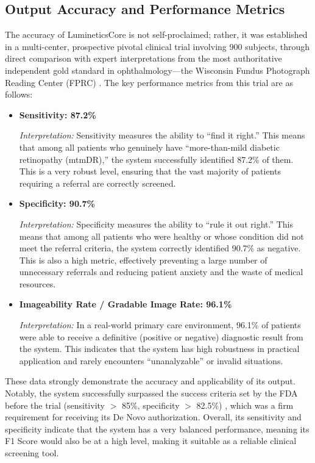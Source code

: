 \documentclass[sigplan,screen]{acmart}
\begin{document}
\subsection{Output Accuracy and Performance Metrics}

The accuracy of LumineticsCore is not self-proclaimed; rather, it was established in a multi-center, prospective pivotal clinical trial involving 900 subjects, through direct comparison with expert interpretations from the most authoritative independent gold standard in ophthalmology---the Wisconsin Fundus Photograph Reading Center (FPRC) \cite{abramoff2018pivotal}. The key performance metrics from this trial are as follows:

\begin{itemize}
\item \textbf{Sensitivity: 87.2\%}

\textit{Interpretation:} Sensitivity measures the ability to ``find it right.'' This means that among all patients who genuinely have ``more-than-mild diabetic retinopathy (mtmDR),'' the system successfully identified 87.2\% of them. This is a very robust level, ensuring that the vast majority of patients requiring a referral are correctly screened.

\item \textbf{Specificity: 90.7\%}

\textit{Interpretation:} Specificity measures the ability to ``rule it out right.'' This means that among all patients who were healthy or whose condition did not meet the referral criteria, the system correctly identified 90.7\% as negative. This is also a high metric, effectively preventing a large number of unnecessary referrals and reducing patient anxiety and the waste of medical resources.

\item \textbf{Imageability Rate / Gradable Image Rate: 96.1\%}

\textit{Interpretation:} In a real-world primary care environment, 96.1\% of patients were able to receive a definitive (positive or negative) diagnostic result from the system. This indicates that the system has high robustness in practical application and rarely encounters ``unanalyzable'' or invalid situations.
\end{itemize}

These data strongly demonstrate the accuracy and applicability of its output. Notably, the system successfully surpassed the success criteria set by the FDA before the trial (sensitivity $>$ 85\%, specificity $>$ 82.5\%) \cite{fda2018denovo_summary}, which was a firm requirement for receiving its De Novo authorization. Overall, its sensitivity and specificity indicate that the system has a very balanced performance, meaning its F1 Score would also be at a high level, making it suitable as a reliable clinical screening tool.
\end{document}
